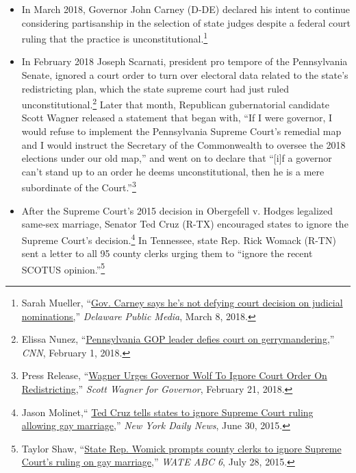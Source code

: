 \documentclass[12pt]{article}
\begin{document}
\begin{itemize}
\item In March 2018, Governor John Carney (D-DE) declared his intent to continue considering partisanship in the selection of state judges despite a federal court ruling that the practice is unconstitutional.\footnote{Sarah Mueller, ``\href{https://www.delawarepublic.org/post/gov-carney-says-hes-not-defying-court-decision-judicial-nominations}{Gov. Carney says he's not defying court decision on judicial nominations,}'' \emph{Delaware Public Media}, March 8, 2018. }

\item In February 2018 Joseph Scarnati, president pro tempore of the Pennsylvania Senate, ignored a court order to turn over electoral data related to the state's redistricting plan, which the state supreme court had just ruled unconstitutional.\footnote{Elissa Nunez, ``\href{https://www.cnn.com/2018/02/01/politics/pennsylvania-gerrymandering/index.html}{Pennsylvania GOP leader defies court on gerrymandering},'' \emph{CNN}, February 1, 2018.} Later that month, Republican gubernatorial candidate Scott Wagner released a statement that began with, ``If I were governor, I would refuse to implement the Pennsylvania Supreme Court’s remedial map and I would instruct the Secretary of the Commonwealth to oversee the 2018 elections under our old map,'' and went on to declare that ``[i]f a governor can't stand up to an order he deems unconstitutional, then he is a mere subordinate of the Court.''\footnote{Press Release, ``\href{https://wagnerforgov.com/2018/02/21/wolf-ignore-court-order-redistricting/}{Wagner Urges Governor Wolf To Ignore Court Order On Redistricting},'' \emph{Scott Wagner for Governor}, February 21, 2018.}

\item After the Supreme Court's 2015 decision in Obergefell v. Hodges legalized same-sex marriage, Senator Ted Cruz (R-TX) encouraged states to ignore the Supreme Court's decision.\footnote{Jason Molinet,`` \href{https://www.nydailynews.com/news/politics/ted-cruz-states-ignore-supremes-ruling-gay-marriage-article-1.2275933}{Ted Cruz tells states to ignore Supreme Court ruling allowing gay marriage},'' \emph{New York Daily News}, June 30, 2015.} In Tennessee, state Rep. Rick Womack (R-TN) sent a letter to all 95 county clerks urging them to ``ignore the recent SCOTUS opinion.''\footnote{Taylor Shaw, ``\href{https://www.wate.com/news/state-rep-womick-sends-letter-to-county-clerks-urging-them-to-ignore-scotus-decision-on-same-sex-marriage/793101739}{State Rep. Womick prompts county clerks to ignore Supreme Court's ruling on gay marriage},'' \emph{WATE ABC 6}, July 28, 2015.}


\end{itemize}
\end{document}

